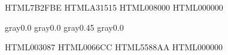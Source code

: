 
\providecommand{\THEME}{ide}

\ifdefined{}
  \renewcommand{\THEME}{\inputtheme}
\fi


\usepackage[protrusion=true,expansion=false]{microtype}


\usepackage{graphicx}

\setlength{\parindent}{0pt}
\setlength{\parskip}{2.5mm}

\usepackage{xcolor}

\providecommand{\THEME}{ide}

\definecolor{ide-kw}     {HTML}{7B2FBE}  %
\definecolor{ide-str}    {HTML}{A31515}  %
\definecolor{ide-cmt}    {HTML}{008000}  %
\definecolor{ide-base}   {HTML}{000000}  %

\definecolor{print-kw}   {gray}{0.0}
\definecolor{print-str}  {gray}{0.0}
\definecolor{print-cmt}  {gray}{0.45}
\definecolor{print-base} {gray}{0.0}

\definecolor{blue-kw}    {HTML}{003087}
\definecolor{blue-str}   {HTML}{0066CC}
\definecolor{blue-cmt}   {HTML}{5588AA}
\definecolor{blue-base}  {HTML}{000000}

